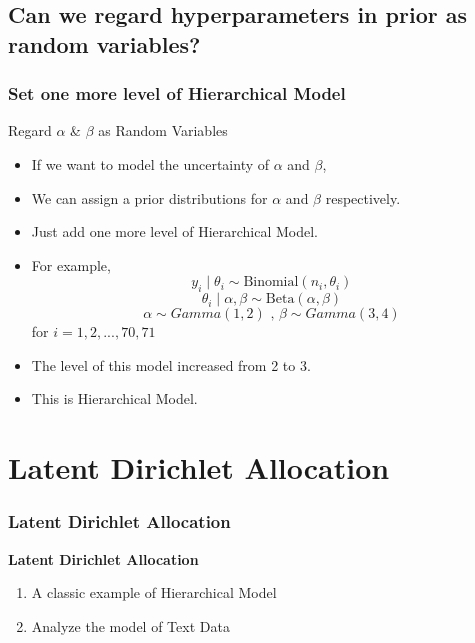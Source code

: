 \documentclass{beamer}
\begin{document}
\subsection{Can we regard hyperparameters in prior as random variables?}
\begin{frame}
\frametitle{Set one more level of Hierarchical Model}
\begin{block}{Regard $\alpha$ \& $\beta$ as Random Variables}
\begin{itemize}
\item If we want to model the uncertainty of $\alpha$ and $\beta$,
\item We can assign a prior distributions for $\alpha$ and $\beta$ respectively.
\item Just add one more level of Hierarchical Model.
\item For example,
$$y_i \mid \theta_i \sim \text{Binomial}(n_i,\theta_i) $$
$$\theta_i \mid \alpha, \beta \sim \text{Beta}(\alpha,\beta)$$
$$\alpha \sim Gamma(1,2) \text{ , } \beta \sim Gamma(3,4)$$  for $i = 1,2,...,70,71$
\item The level of this model increased from 2 to 3.
\item This is Hierarchical Model.
\end{itemize}
\end{block}
\end{frame}

\section{Latent Dirichlet Allocation}
\begin{frame}
\sectionpage
\end{frame}

\begin{frame}
\frametitle{Latent Dirichlet Allocation}
\textbf{Latent Dirichlet Allocation}
\begin{enumerate}
\item A classic example of Hierarchical Model
\item Analyze the model of Text Data
\end{enumerate}
\end{frame}
\end{document}
